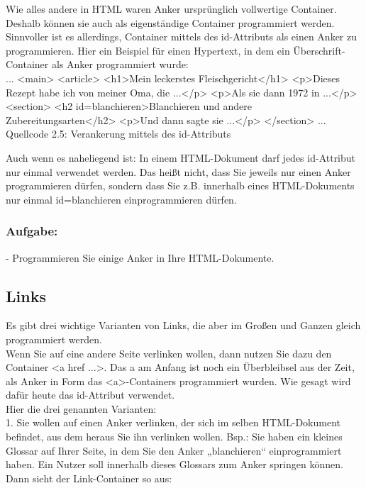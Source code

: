 Wie alles andere in HTML waren Anker ursprünglich vollwertige Container. Deshalb können sie auch als eigenständige Container programmiert werden. Sinnvoller ist es allerdings, Container mittels des id-Attributs als einen Anker zu programmieren. Hier ein Beispiel für einen Hypertext, in dem ein Überschrift-Container als Anker programmiert wurde:\\

...
<main>
<article>
<h1>Mein leckerstes Fleischgericht</h1>
<p>Dieses Rezept habe ich von meiner Oma, die ...</p>
<p>Als sie dann 1972 in ...</p>
<section>
<h2 id=blanchieren>Blanchieren und andere Zubereitungsarten</h2>
<p>Und dann sagte sie ...</p>
</section>
... 
Quellcode 2.5: Verankerung mittels des id-Attributs

Auch wenn es naheliegend ist: In einem HTML-Dokument darf jedes id-Attribut nur einmal verwendet werden. Das heißt nicht, dass Sie jeweils nur einen Anker programmieren dürfen, sondern dass Sie z.B. innerhalb eines HTML-Dokuments nur einmal id=blanchieren einprogrammieren dürfen.

\subsubsection{Aufgabe:}

-	Programmieren Sie einige Anker in Ihre HTML-Dokumente.

\subsection{Links}

Es gibt drei wichtige Varianten von Links, die aber im Großen und Ganzen gleich programmiert werden.\\

Wenn Sie auf eine andere Seite verlinken wollen, dann nutzen Sie dazu den Container <a href ...>. Das a am Anfang ist noch ein Überbleibsel aus der Zeit, als Anker in Form das <a>-Containers programmiert wurden. Wie gesagt wird dafür heute das id-Attribut verwendet.\\

Hier die drei genannten Varianten:\\

1.	Sie wollen auf einen Anker verlinken, der sich im selben HTML-Dokument befindet, aus dem heraus Sie ihn verlinken wollen. Bsp.: Sie haben ein kleines Glossar auf Ihrer Seite, in dem Sie den Anker „blanchieren“ einprogrammiert haben. Ein Nutzer soll innerhalb dieses Glossars zum Anker springen können. Dann sieht der Link-Container so aus:

